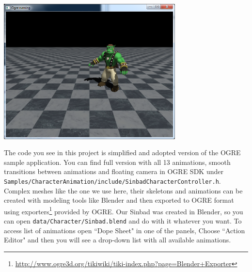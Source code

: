 \documentclass{article}
\begin{document}
\begin{center}
\includegraphics[width=0.7\textwidth]{meshanim.png}
\end{center}

The code you see in this project is simplified and adopted version of the OGRE sample application. You can find full version with all 13 animations, smooth transitions between animations and floating camera in OGRE SDK under \verb#Samples/CharacterAnimation/include/SinbadCharacterController.h#.
\ \\

Complex meshes like the one we use here, their skeletons and animations can be created with modeling tools like Blender and then exported to OGRE format using exporters\footnote{\url{http://www.ogre3d.org/tikiwiki/tiki-index.php?page=Blender+Exporter}} provided by OGRE. Our Sinbad was created in Blender, so you can open \verb#data/Character/Sinbad.blend# and do with it whatever you want. To access list of animations open ``Dope Sheet" in one of the panels, Choose ``Action Editor" and then you will see a drop-down list with all available animations.
\end{document}
